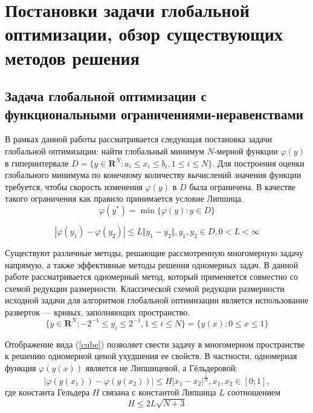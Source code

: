 \section{Постановки задачи глобальной оптимизации, обзор существующих методов решения}

\subsection{Задача глобальной оптимизации с функциональными ограничениями-неравенствами}
В рамках данной работы рассматривается следующая постановка задачи глобальной
оптимизации: найти глобальный минимум \(N\)-мерной функции \(\varphi(y)\) в гиперинтервале
\(D=\{y\in \mathbf{R}^N:a_i\leqslant x_i\leqslant{b_i}, 1\leqslant{i}\leqslant{N}\}\).
Для построения оценки глобального минимума по конечному количеству вычислений
значения функции требуется, чтобы скорость изменения \(\varphi(y)\) в \(D\) была ограничена.
В качестве такого ограничения как правило принимается условие Липшица.
\begin{equation}
\label{eq:task}
\varphi(y^*)=\min\{\varphi(y):y\in D\}
\end{equation}

\begin{equation}
\label{eq:lip}
|\varphi(y_1)-\varphi(y_2)|\leqslant L\Vert y_1-y_2\Vert,y_1,y_2\in D,0<L<\infty
\end{equation}

Существуют различные методы, решающие рассмотренную многомерную задачу напрямую,
а также эффективные методы решения одномерных задач. В данной работе рассматривается одномерный метод,
который применяется совместно со схемой редукции размерности.
Классической схемой редукции размерности исходной задачи для алгоритмов глобальной оптимизации является
использование разверток --- кривых, заполняющих пространство.
\begin{equation}
\label{cube}
\lbrace y\in \mathbf{R}^N:-2^{-1}\leqslant y_i\leqslant 2^{-1},1\leqslant i\leqslant N\rbrace=\{y(x):0\leqslant x\leqslant 1\}
\end{equation}

Отображение вида (\ref{cube}) позволяет свести задачу в многомерном пространстве к решению
одномерной ценой ухудшения ее свойств. В частности, одномерная функция \(\varphi(y(x))\)
является не Липшицевой, а Гёльдеровой:
\begin{displaymath}
\label{holder}
|\varphi(y(x_1))-\varphi(y(x_2))|\leqslant H{|x_1-x_2|}^{\frac{1}{N}},x_1,x_2\in[0;1],
\end{displaymath}
где константа Гельдера \(H\) связана с константой Липшица \(L\) соотношением
\begin{equation}
  \label{eq:conv_cond}
 H\leqslant 2L\sqrt{N+3}
\end{equation}


